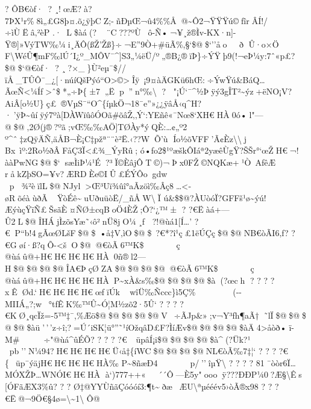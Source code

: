 ?  ÔB€òƒ· ? 
¸!œÆ?à?7ÞX¹r\%\textbar8ì„£G8þ¤.õ¿ÿþCZ;-ñÐµŒ¬û4\%\%Å@\textasciitilde Ô2¬ŸŸŸú©ƒîrÂÍ!/÷ìÙËâ‚²èP
.· L\$àá(?
¨C???ºÙô-Ñ•¬¥¸ž®Ìv-KX·n{]}-Ÿ®{]}»VýTW‰¼i¸ÄÔ(ßŽ'Žß\}÷¬E''9Ò+\#üÃ\%,§`\$@\$`'' åo
ð Û·o×­Ö
F\textbackslash Wé\textbar Û¶mF‰lÚ´I¿º\_MÔV¯\^{}{]}S3„¼ëÜ/º„®B¿®ïÞ\}÷ÝŸþ9(!¬eÞ¼y:7ˆ«p£?\$@\$`@€òƒ·
? 
¸?×\_\}Ù²eµ¯\$//ïÅ\_TÛÔ¯\_¿{[}·núíQšPýó``O\textgreater©\textgreaterÎÿ~\textbar¡9¤àÄGKü6hŒ:÷ÝwŸú\&BáQ\ldots ÃœÑ\textless¼Íƒ\textgreater ˆ\$*„÷Þ\{±7„Ë\textquotesinglep''n°‰\textbackslash
? 
"¡Ú`¯\^{}½Þÿý3gÎT\textquotesingle²\textasciitilde ýz+ëNO¡V?AiÂ{[}o½U\}ç£®VµS¯``\textquotesingle O\^{}\{íµkÖ¬18¯e''»¿¿ÿâÅ‹q\^{}H?·'ÿÞ\textasciitilde ûíÿý7ºà{[}\textbar DÀWïûôÓOã\#õâŽ‚ ‚Ý`:YEñê«¯Nœ8`XH€HÀ0ó•l"---@\$@‚2Ø(j®?ºã;vŒ‰‰AÖ{]}TØÀy*ýQÈ:\ldots¢„º2
º\^{}ˆ‡zQÿÄÑ,äÅB¬È¡C‡pžª¨¨è²Ë.‹??WÕ'ù
Ío½õVFF'Ã¢Èz\textbackslash\textbackslashj
Bx~ìº:2Ro½ðÂFåÇ3Ï\textless£¾\_ÝyRû;
ó•ƒo2\$¹ºæškÔIáª2yæêÙgŸ?ŠŠr°`œŽH€¬!ààPwNG\$@\$`sæÌiÞ¼¹É?³Ï©ÈâjÔT©)¬Þx0FŽ©NQKæ+\textbar¹Ò~AƒêÆ
råkZþSO=¥v?ÆRDÈ\textbar e©IÛ£ÉÝÔo gdw
p¾²èïlL\$@NJ yl\textgreater Œ³Uï¾ûî°aÃzöì‰Âç8\ldots\textless­øRõéàùðÃŸ\textbar òÉê\textasciitildeuUðuüòË/\_\textbar ñÅW\textbackslashÏ
ú\&\$\$@?ÀUòóÏ?GFFš¹ø\textasciitilde ýú!ÆýùçŸïÑ£ŠsãÈ¤ÑØ±cqBoÖ4ÈŽ;Ô?{}`¿™±
?  ?€Ëàá+---Û2L\$@ÎH ÁjÌzõsYæ˜‹ô²nÜ8jO¼¸f ?!@ùá1{[}Í\ldots' 
?€P``b!4gÃœØLšF\$@\$~• å‡V‚ìO\$@\$~?€*?î¹ç£1ëÚÇç\$@\$@NB€òÃI6‚f? 
?€Gøí·ß?qÕ-\textless šO\$@@€òÃ6™K\$    ç
@ùáû@+H€H€H€H€HÀ0ñ®l2---H\$@\$@\$@\$@ÎA€ÞçØZA\$@\$@\$@\$@@€òÃ6™K\$    ç
@ùáû@+H€H€H€H€HÀP\textasciitilde xÀ\&s‰\$@\$@\$@\$@\$à(?œch ?  ?  ?  ? 
x ÊØd.`H€H€H€H€œƒ ïÚk wîÜ‰Ñccc\}\textbar\textbar ì5Ç\%   
(-\/-MIIÁ„?;w°tfÊK‰™Û\textasciitilde Ó¦M½zõ2·5Û`  ?  ?  ? 
?€KØ¸qcÏž=-5™‡¯,\%Æö\$@\$@\$@\$@\$@V~÷ÃJp\&»;v¬Y³fh¶aÃ†˜lÏ\$@\$@\$@\$@\$àü'\,'\,'z÷î;?=Ú´iSK¦ü°''˜¹íOžqâD£F?ÌíÆv\$@\$@\$@\$@\$àÄ4\textgreater åòð•ï-M\#
÷"@ùá\^{}ûÉÕ?  ?  ?  ?  ?€~üpâÍ¡i\$@\$@\$@\$@\$à\^{}(?Ük?¹   
pb''N¼94?H€H€H€H€Ü‹ å‡\{í\textquotesingle WC\$@\$@\$@\$@NL€òÃ‰7‡¦`  ?  ?  ? 
?€\{~üp¯ýäjH€H€H€H€HÀ‰ P\textasciitilde8ñæÐ4    p/''îµŸ\textbackslash{}
?  ?  ?  ?  81¯òòr\textquotesingle6Ï\ldots MÓXŽÞ\ldots WNÓI€H€HÀ
à`)777++«~~~´´Ô---È5y"oooÿ???ÐÐP¼0?Æ§\textbackslash Ês {[}ÓFãÆX3\%û?  ?  ? 
Ø‡@YYÙñãÇóóóí3:¶t\textasciitildeðæÆU\textbackslash ªµééév5›òÃ®x98 ?  ? 
?€Ë@¬9Ö€§4ø=\textbackslash\textasciitilde1\textbackslash  Ô@
